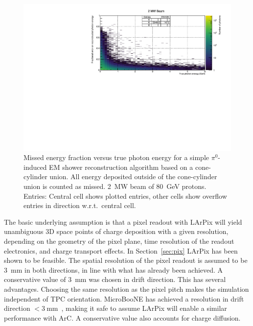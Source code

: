 \documentclass[a4paper]{article}
\begin{document}
\begin{figure}[tbp]
	\centering
	\includegraphics[width=\textwidth]{Figures/2MW/rel_2d_missed}
	\caption[Pile-up study missed fractional vs.\ true photon energy, \SI{2}{\mega\watt} beam]{%
		Missed energy fraction versus true photon energy for a simple $\pi^0$-induced EM shower reconstruction algorithm based on a cone-cylinder union.
		All energy deposited outside of the cone-cylinder union is counted as missed.
		\SI{2}{\mega\watt} beam of \SI{80}{\giga\electronvolt} protons.
		Entries: Central cell shows plotted entries, other cells show overflow entries in direction w.r.t.\ central cell.
	}
	\label{fig:dune-nd_2MW_rel-2d-missed}
\end{figure}

The basic underlying assumption is that a pixel readout with LArPix will yield unambiguous 3D space points of charge deposition with a given resolution, depending on the geometry of the pixel plane, time resolution of the readout electronics, and charge transport effects.
In Section~\ref{sec:pix} LArPix has been shown to be feasible.
The spatial resolution of the pixel readout is assumed to be \SI{3}{\milli\metre} in both directions, in line with what has already been achieved.
A conservative value of \SI{3}{\milli\meter} was chosen in drift direction.
This has several advantages.
Choosing the same resolution as the pixel pitch makes the simulation independent of TPC orientation.
MicroBooNE has achieved a resolution in drift direction $< \SI{3}{\milli\metre}$~\cite{uboner}, making it safe to assume LArPix will enable a similar performance with ArC.
A conservative value also accounts for charge diffusion.
\end{document}
